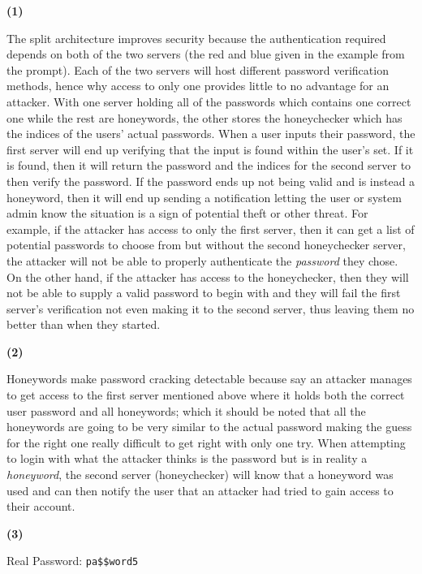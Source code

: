 \documentclass[11pt]{article}
\renewcommand\part[1]{\vspace{.10in}\textbf{(#1)}\par}
\begin{document}
	\part{1}
		The split architecture improves security because the authentication required depends on both of the two servers (the red and blue given in the example from the prompt). Each of the two servers will host different password verification methods, hence why access to only one provides little to no advantage for an attacker. With one server holding all of the passwords which contains one correct one while the rest are honeywords, the other stores the honeychecker which has the indices of the users' actual passwords. When a user inputs their password, the first server will end up verifying that the input is found within the user's set. If it is found, then it will return the password and the indices for the second server to then verify the password. If the password ends up not being valid and is instead a honeyword, then it will end up sending a notification letting the user or system admin know the situation is a sign of potential theft or other threat. For example, if the attacker has access to only the first server, then it can get a list of potential passwords to choose from but without the second honeychecker server, the attacker will not be able to properly authenticate the \textit{password} they chose. On the other hand, if the attacker has access to the honeychecker, then they will not be able to supply a valid password to begin with and they will fail the first server's verification not even making it to the second server, thus leaving them no better than when they started.
	
	\part{2}
		Honeywords make password cracking detectable because say an attacker manages to get access to the first server mentioned above where it holds both the correct user password and all honeywords; which  it should be noted that all the honeywords are going to be very similar to the actual password making the guess for the right one really difficult to get right with only one try. When attempting to login with what the attacker thinks is the password but is in reality a \textit{honeyword}, the second server (honeychecker) will know that a honeyword was used and can then notify the user that an attacker had tried to gain access to their account.

	\part{3}
		Real Password: \texttt{pa\$\$word5}
\end{document}
